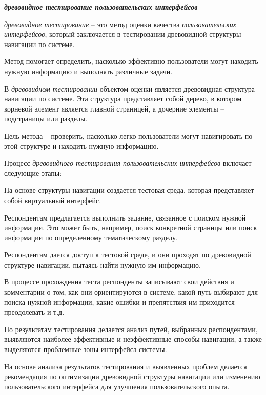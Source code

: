 \textbf{\textit{древовидное тестирование пользовательских интерфейсов}}

\textit{древовидное тестирование} -- это метод оценки качества \textit{пользовательских интерфейсов}, который заключается в тестировании древовидной структуры навигации по системе.

Метод помогает определить, насколько эффективно пользователи могут находить нужную информацию и выполнять различные задачи.

В \textit{древовидном тестировании} объектом оценки является древовидная структура навигации по системе. Эта структура представляет собой дерево, в котором корневой элемент является главной страницей, а дочерние элементы -- подстраницы или разделы. 

Цель метода -- проверить, насколько легко пользователи могут навигировать по этой структуре и находить нужную информацию.

Процесс \textit{древовидного тестирования пользовательских интерфейсов} включает следующие этапы:
\begin{textitemize}
	\item На основе структуры навигации создается тестовая среда, которая представляет собой виртуальный интерфейс.
	
	\item Респондентам предлагается выполнить задание, связанное с поиском нужной информации. Это может быть, например, поиск конкретной страницы или поиск информации по определенному тематическому разделу.
	
	\item Респондентам дается доступ к тестовой среде, и они проходят по древовидной структуре навигации, пытаясь найти нужную им информацию.
	
	\item В процессе прохождения теста респонденты записывают свои действия и комментарии о том, как они ориентируются в системе, какой путь выбирают для поиска нужной информации, какие ошибки и препятствия им приходится преодолевать и т.д.
	
	\item По результатам тестирования делается анализ путей, выбранных респондентами, выявляются наиболее эффективные и неэффективные способы навигации, а также выделяются проблемные зоны интерфейса системы.
	
	\item На основе анализа результатов тестирования и выявленных проблем делается рекомендация по оптимизации древовидной структуры навигации или изменению пользовательского интерфейса для улучшения пользовательского опыта.
\end{textitemize}

